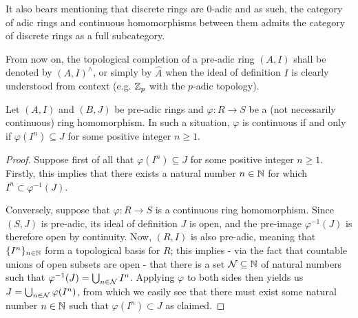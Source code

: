             \begin{example}
                It also bears mentioning that discrete rings are $0$-adic and as such, the category of adic rings and continuous homomorphisms between them admits the category of discrete rings as a full subcategory. 
            \end{example}
            \begin{convention} \label{conv: adic_completions}
                From now on, the topological completion of a pre-adic ring $(A, I)$ shall be denoted by $(A, I)^{\wedge}$, or simply by $\hat{A}$ when the ideal of definition $I$ is clearly understood from context (e.g. $\mathbb{Z}_p$ with the $p$-adic topology).
            \end{convention}
            \begin{proposition} \label{prop: continuity_criterion_for_homomorphisms_between_pre_adic_rings}
                Let $(A, I)$ and $(B, J)$ be pre-adic rings and $\varphi: R \to S$ be a (not necessarily continuous) ring homomorphism. In such a situation, $\varphi$ is continuous if and only if $\varphi(I^n) \subseteq J$ for some positive integer $n \geq 1$. 
            \end{proposition}
                \begin{proof}
                    Suppose first of all that $\varphi(I^n) \subseteq J$ for some positive integer $n \geq 1$. Firstly, this implies that there exists a natural number $n \in \mathbb{N}$ for which $I^n \subset \varphi^{-1}(J)$. 
                    
                    Conversely, suppose that $\varphi: R \to S$ is a continuous ring homomorphism. Since $(S, J)$ is pre-adic, its ideal of definition $J$ is open, and the pre-image $\varphi^{-1}(J)$ is therefore open by continuity. Now, $(R, I)$ is also pre-adic, meaning that $\{I^n\}_{n \in \mathbb{N}}$ form a topological basis for $R$; this implies - via the fact that countable unions of open subsets are open - that there is a set $\mathcal{N} \subseteq \mathbb{N}$ of natural numbers such that $\varphi^{-1}(J) = \bigcup_{n \in \mathcal{N}} I^n$. Applying $\varphi$ to both sides then yields us $J = \bigcup_{n \in \mathcal{N}} \varphi(I^n)$, from which we easily see that there must exist some natural number $n \in \mathbb{N}$ such that $\varphi(I^n) \subset J$ as claimed. 
                \end{proof}
